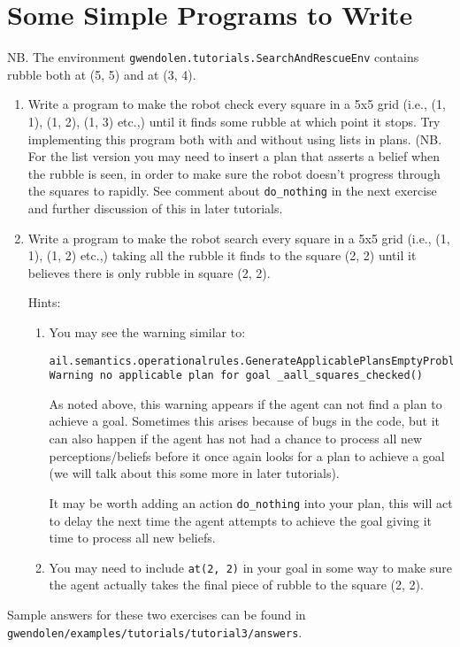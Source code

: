 \documentclass[a4]{article}
\begin{document}
\section{Some Simple Programs to Write}
NB.  The environment \texttt{gwendolen.tutorials.SearchAndRescueEnv} contains rubble both at (5, 5) and at (3, 4).
\begin{enumerate}
\item Write a program to make the robot check every square in a 5x5 grid (i.e., (1, 1), (1, 2), (1, 3) etc.,) until it finds some rubble at which point it stops.  Try implementing this program both with and without using lists in plans.  (NB.  For the list version you may need to insert a plan that asserts a belief when the rubble is seen, in order to make sure the robot doesn't progress through the squares to rapidly.  See comment about \lstinline{do_nothing} in the next exercise and further discussion of this in later tutorials.
\item Write a program to make the robot search every square in a 5x5 grid (i.e., (1, 1), (1, 2) etc.,) taking all the rubble it finds to the square (2, 2) until it believes there is only rubble in square (2, 2).

Hints:
\begin{enumerate}
\item You may see the warning similar to:
\begin{small}
\begin{verbatim}
ail.semantics.operationalrules.GenerateApplicablePlansEmptyProblemGoal[WARNING|main|2:09:29]: 
Warning no applicable plan for goal _aall_squares_checked() 
\end{verbatim}
\end{small}
As noted above, this warning appears if the agent can not find a plan to achieve a goal.  Sometimes this arises because of bugs in the code, but it can also happen if the agent has not had a chance to process all new perceptions/beliefs before it once again looks for a plan to achieve a goal (we will talk about this some more in later tutorials).  

It may be worth adding an action \lstinline{do_nothing} into your plan, this will act to delay the next time the agent attempts to achieve the goal giving it time to process all new beliefs.
\item You may need to include \lstinline{at(2, 2)} in your goal in some way to make sure the agent actually takes the final piece of rubble to the square (2, 2).
\end{enumerate}
\end{enumerate}
\begin{sloppypar}
Sample answers for these two exercises can be found in \texttt{gwendolen/examples/tutorials/tutorial3/answers}.
\end{sloppypar}
\end{document}
